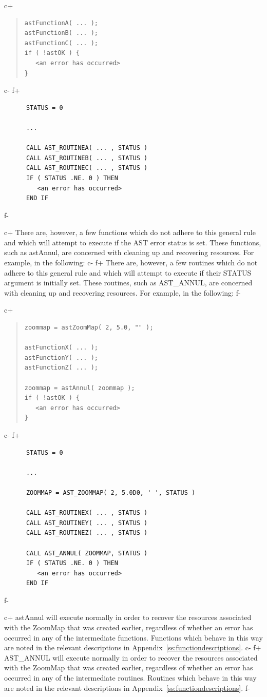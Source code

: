 \documentclass[twoside,11pt]{article}
\newcommand{\appref}[1]{Appendix~\ref{#1}}
\newcommand{\appref}[1]{\ref{#1}}
\begin{document}
c+
\begin{quote}
\small
\begin{verbatim}
astFunctionA( ... );
astFunctionB( ... );
astFunctionC( ... );
if ( !astOK ) {
   <an error has occurred>
}
\end{verbatim}
\normalsize
\end{quote}
c-
f+
\small
\begin{verbatim}
      STATUS = 0

      ...

      CALL AST_ROUTINEA( ... , STATUS )
      CALL AST_ROUTINEB( ... , STATUS )
      CALL AST_ROUTINEC( ... , STATUS )
      IF ( STATUS .NE. 0 ) THEN
         <an error has occurred>
      END IF
\end{verbatim}
\normalsize
f-

c+
There are, however, a few functions which do not adhere to this
general rule and which will attempt to execute if the AST error status
is set. These functions, such as astAnnul, are concerned with cleaning
up and recovering resources. For example, in the following:
c-
f+
There are, however, a few routines which do not adhere to this general
rule and which will attempt to execute if their STATUS argument is
initially set.  These routines, such as AST\_ANNUL, are concerned with
cleaning up and recovering resources. For example, in the following:
f-

c+
\begin{quote}
\small
\begin{verbatim}
zoommap = astZoomMap( 2, 5.0, "" );

astFunctionX( ... );
astFunctionY( ... );
astFunctionZ( ... );

zoommap = astAnnul( zoommap );
if ( !astOK ) {
   <an error has occurred>
}
\end{verbatim}
\normalsize
\end{quote}
c-
f+
\small
\begin{verbatim}
      STATUS = 0

      ...

      ZOOMMAP = AST_ZOOMMAP( 2, 5.0D0, ' ', STATUS )

      CALL AST_ROUTINEX( ... , STATUS )
      CALL AST_ROUTINEY( ... , STATUS )
      CALL AST_ROUTINEZ( ... , STATUS )

      CALL AST_ANNUL( ZOOMMAP, STATUS )
      IF ( STATUS .NE. 0 ) THEN
         <an error has occurred>
      END IF
\end{verbatim}
\normalsize
f-

c+
astAnnul will execute normally in order to recover the resources
associated with the ZoomMap that was created earlier, regardless of
whether an error has occurred in any of the intermediate functions.
Functions which behave in this way are noted in the relevant
descriptions in \appref{ss:functiondescriptions}.
c-
f+
AST\_ANNUL will execute normally in order to recover the resources
associated with the ZoomMap that was created earlier, regardless of
whether an error has occurred in any of the intermediate routines.
Routines which behave in this way are noted in the relevant
descriptions in \appref{ss:functiondescriptions}.
f-
\end{document}

